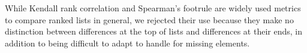 While Kendall rank correlation \cite{kendallNEWMEASURERANK1938b} and Spearman's footrule  \cite{spearmanCorrelationCalculatedFaulty1910} are widely used metrics to compare ranked lists in general, we rejected their use because they make no distinction between differences at the top of lists and differences at their ends, in addition to being difficult to adapt to handle for missing elements.

%
%
%
%
%
%
%
%
%

